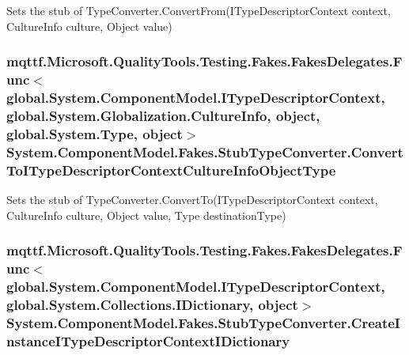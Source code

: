 Sets the stub of Type\-Converter.\-Convert\-From(\-I\-Type\-Descriptor\-Context context, Culture\-Info culture, Object value)

\hypertarget{class_system_1_1_component_model_1_1_fakes_1_1_stub_type_converter_ad6bd8be24731ccd366858ac0f1ebab76}{
\subsubsection[{Convert\-To\-I\-Type\-Descriptor\-Context\-Culture\-Info\-Object\-Type}]{\setlength{\rightskip}{0pt plus 5cm}mqttf.\-Microsoft.\-Quality\-Tools.\-Testing.\-Fakes.\-Fakes\-Delegates.\-Func$<$global.\-System.\-Component\-Model.\-I\-Type\-Descriptor\-Context, global.\-System.\-Globalization.\-Culture\-Info, object, global.\-System.\-Type, object$>$ System.\-Component\-Model.\-Fakes.\-Stub\-Type\-Converter.\-Convert\-To\-I\-Type\-Descriptor\-Context\-Culture\-Info\-Object\-Type}}\label{class_system_1_1_component_model_1_1_fakes_1_1_stub_type_converter_ad6bd8be24731ccd366858ac0f1ebab76}


Sets the stub of Type\-Converter.\-Convert\-To(\-I\-Type\-Descriptor\-Context context, Culture\-Info culture, Object value, Type destination\-Type)

\hypertarget{class_system_1_1_component_model_1_1_fakes_1_1_stub_type_converter_a7638b531efadec1eda0bff9150297677}{
\subsubsection[{Create\-Instance\-I\-Type\-Descriptor\-Context\-I\-Dictionary}]{\setlength{\rightskip}{0pt plus 5cm}mqttf.\-Microsoft.\-Quality\-Tools.\-Testing.\-Fakes.\-Fakes\-Delegates.\-Func$<$global.\-System.\-Component\-Model.\-I\-Type\-Descriptor\-Context, global.\-System.\-Collections.\-I\-Dictionary, object$>$ System.\-Component\-Model.\-Fakes.\-Stub\-Type\-Converter.\-Create\-Instance\-I\-Type\-Descriptor\-Context\-I\-Dictionary}}\label{class_system_1_1_component_model_1_1_fakes_1_1_stub_type_converter_a7638b531efadec1eda0bff9150297677}


